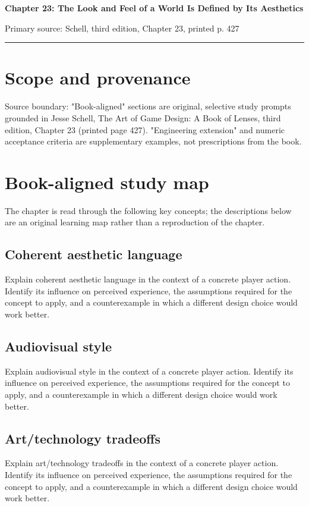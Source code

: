 \documentclass[11pt]{article}
\begin{document}
{\huge\bfseries\color{suiteblue} Chapter 23: The Look and Feel of a World Is Defined by Its Aesthetics}\par
\vspace{0.15in}
{\normalsize\color{suitegray} Primary source: Schell, third edition, Chapter 23, printed p. 427}\par
\vspace{0.15in}\hrule\vspace{0.15in}

\section{Scope and provenance}
Source boundary: "Book-aligned" sections are original, selective study prompts grounded in Jesse Schell, The Art of Game Design: A Book of Lenses, third edition, Chapter 23 (printed page 427). "Engineering extension" and numeric acceptance criteria are supplementary examples, not prescriptions from the book.


\section{Book-aligned study map}
The chapter is read through the following key concepts; the descriptions below are an original learning map rather than a reproduction of the chapter.


\subsection{Coherent aesthetic language}
Explain coherent aesthetic language in the context of a concrete player action. Identify its influence on perceived experience, the assumptions required for the concept to apply, and a counterexample in which a different design choice would work better.


\subsection{Audiovisual style}
Explain audiovisual style in the context of a concrete player action. Identify its influence on perceived experience, the assumptions required for the concept to apply, and a counterexample in which a different design choice would work better.


\subsection{Art/technology tradeoffs}
Explain art/technology tradeoffs in the context of a concrete player action. Identify its influence on perceived experience, the assumptions required for the concept to apply, and a counterexample in which a different design choice would work better.
\end{document}
